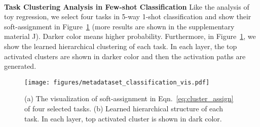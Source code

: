 \documentclass{article}
\begin{document}
\\
\textbf{Task Clustering Analysis in Few-shot Classification}
Like the analysis of toy regression, we select four tasks in 5-way 1-shot classification and show their soft-assignment in Figure~\ref{fig:vis_metadata} (more results are shown in the supplementary material J). Darker color means higher probability. Furthermore, in Figure~\ref{fig:vis_metadata}, we show the learned hierarchical clustering of each task. In each layer, the top activated clusters are shown in darker color and then the activation paths are generated.
\begin{figure}[h]
	\centering
 	\texttt{[image: figures/metadataset\_classification\_vis.pdf]}
	\caption{(a) The visualization of soft-assignment in Eqn.~\eqref{eq:cluster_assign} of four selected tasks.
	(b) Learned hierarchical structure of each task. In each layer, top activated cluster is shown in dark color.} 
	\label{fig:vis_metadata}
\end{figure}
\end{document}
